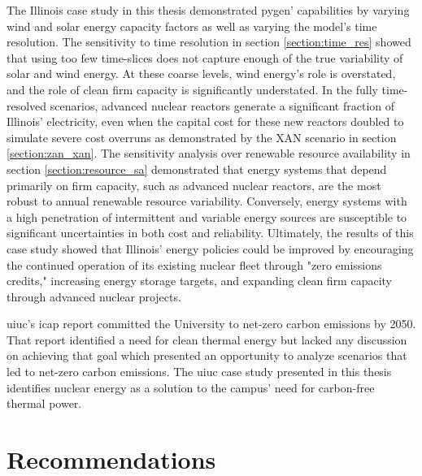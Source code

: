 The Illinois case study in this thesis
demonstrated \gls{pygen}' capabilities by varying wind and solar energy capacity factors
as well as varying the model's time resolution. The sensitivity to time resolution
in section \ref{section:time_res}
showed that using too few time-slices does not capture enough of the true variability
of solar and wind energy. At these coarse levels, wind energy's role is overstated,
and the role of clean firm capacity is significantly understated. In the fully
time-resolved scenarios, advanced nuclear reactors generate a significant fraction
of Illinois' electricity, even when the capital cost for these new reactors doubled
to simulate severe cost overruns as demonstrated by the \gls{XAN} scenario in section
\ref{section:zan_xan}. The sensitivity analysis over renewable resource
availability in section \ref{section:resource_sa} demonstrated that energy systems
that depend primarily on firm
capacity, such as advanced nuclear reactors, are the most robust to annual renewable
resource variability. Conversely, energy systems with a high penetration of intermittent
and variable energy sources are susceptible to significant uncertainties in both cost
and reliability. Ultimately, the results of this case study showed that Illinois'
energy policies could be improved by encouraging the continued operation of its
existing nuclear fleet through "zero emissions credits," increasing energy storage
targets, and expanding clean firm capacity through advanced nuclear projects.

\gls{uiuc}'s \gls{icap} report committed the University to net-zero carbon emissions
by 2050. That report identified a need for clean thermal energy but lacked any
discussion on achieving that goal which presented an opportunity to analyze scenarios
that led to net-zero carbon emissions. The \gls{uiuc} case study presented
in this thesis identifies nuclear energy as a solution to the campus' need for
carbon-free thermal power.

\section{Recommendations}

